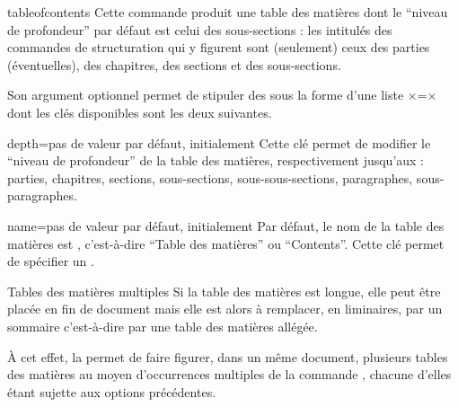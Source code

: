 \begin{docCommand}[doc description=\mandatory]{tableofcontents}{}
  Cette commande produit une table des matières dont le \enquote{niveau de
    profondeur} par défaut est celui des sous-sections : les intitulés des
  commandes de structuration qui y figurent sont (seulement) ceux des parties
  (éventuelles), des chapitres, des sections et des sous-sections.

  Son argument optionnel permet de stipuler des  sous la forme
  d'une liste ×=× dont les clés disponibles sont les
  deux suivantes.
  {%
    \begin{docKey}{depth}{=\textbar{}\textbar{}\textbar{}\textbar{}\textbar{}\textbar{}}{pas
        de valeur par défaut, initialement }
      Cette clé permet de modifier le \enquote{niveau de profondeur} de la
      table des matières, respectivement jusqu'aux : parties, chapitres,
      sections, sous-sections, sous-sous-sections, paragraphes,
      sous-paragraphes.
  \end{docKey}
  }
%
  \begin{docKey}{name}{=}{pas de valeur par défaut,
      initialement }
    Par défaut, le nom de la table des matières est
    , c'est-à-dire \enquote{Table des matières} ou
    \foreignquote{english}{Contents}\selonlangue{}. Cette clé permet de
    spécifier un .
  \end{docKey}
\end{docCommand}

\begin{dbremark}{Tables des matières multiples}{}
  Si la table des matières est longue, elle peut être placée en fin de document
  mais elle est alors à remplacer, en \glspl{liminaire}, par un sommaire
  c'est-à-dire par une table des matières allégée.

  À cet effet, la \yatcl{} permet de faire figurer, dans un même document,
  plusieurs tables des matières au moyen d'occurrences multiples de la commande
  , chacune d'elles étant sujette aux options
  précédentes.
\end{dbremark}

